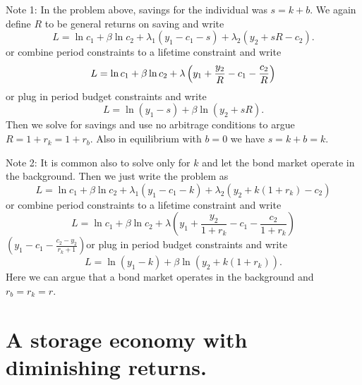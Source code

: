 \documentclass{sebase}
\begin{document}
Note 1: In the problem above, savings for the individual was $s=k+b$. We
again define $R$ to be general returns on saving and write 
\begin{equation*}
L=\ln c_{1}+\beta \ln c_{2}+\lambda _{1}\left( y_{1}-c_{1}-s\right) +\lambda
_{2}\left( y_{2}+sR-c_{2}\right) .
\end{equation*}%
or combine period constraints to a lifetime constraint and write 
\begin{equation*}
L=\ln c_{1}+\beta \ln c_{2}+\lambda \left( y_{1}+\frac{y_{2}}{R}-c_{1}-\frac{%
c_{2}}{R}\right)
\end{equation*}%
or plug in period budget constraints and write%
\begin{equation*}
L=\ln \left( y_{1}-s\right) +\beta \ln \left( y_{2}+sR\right) .
\end{equation*}%
Then we solve for savings and use no arbitrage conditions to argue $%
R=1+r_{k}=1+r_{b}.$ Also in equilibrium with $b=0$ we have $s=k+b=k$.\bigskip

\pagebreak

Note 2: It is common also to solve only for $k$ and let the bond market
operate in the background. Then we just write the problem as%
\begin{equation*}
L=\ln c_{1}+\beta \ln c_{2}+\lambda _{1}\left( y_{1}-c_{1}-k\right) +\lambda
_{2}\left( y_{2}+k\left( 1+r_{k}\right) -c_{2}\right)
\end{equation*}%
or combine period constraints to a lifetime constraint and write 
\begin{equation*}
L=\ln c_{1}+\beta \ln c_{2}+\lambda \left( y_{1}+\frac{y_{2}}{1+r_{k}}-c_{1}-%
\frac{c_{2}}{1+r_{k}}\right)
\end{equation*}%
$\left( y_{1}-c_{1}-\frac{c_{2}-y_{2}}{r_{k}+1}\right) $or plug in period
budget constraints and write%
\begin{equation*}
L=\ln \left( y_{1}-k\right) +\beta \ln \left( y_{2}+k\left( 1+r_{k}\right)
\right) .
\end{equation*}%
Here we can argue that a bond market operates in the background and $%
r_{b}=r_{k}=r.$\pagebreak

\section{A storage economy with diminishing returns.}
\end{document}
